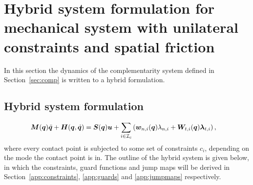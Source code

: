\documentclass[DC2017114Bouma.tex]{subfiles}
\begin{document}
\section{Hybrid system formulation for mechanical system with unilateral constraints and spatial friction}
In this section the dynamics of the complementarity system defined in Section~\ref{sec:comp} is written to a hybrid formulation. 

\subsection{Hybrid system formulation}
\begin{align}
&{\boldsymbol{M}}({\boldsymbol{q}})\ddot{{\boldsymbol{q}}} + {\boldsymbol{H}}({\boldsymbol{q}},\dot{{\boldsymbol{q}}}) = {\boldsymbol{S}}({\boldsymbol{q}}){\boldsymbol{u}} + \sum_{i\in\mathcal{I}_c}\left({\boldsymbol{w}}_{n,i}({\boldsymbol{q}})\lambda_{n,i} + {\boldsymbol{W}}_{t,i}({\boldsymbol{q}})\boldsymbol{\lambda}_{t,i} \right), \label{eq:hybriddyn}
\end{align}
where every contact point is subjected to some set of constraints $c_i$, depending on the mode the contact point is in. The outline of the hybrid system is given below, in which the constraints, guard functions and jump maps will be derived in Section~\ref{app:constraints}, \ref{app:guards} and \ref{app:jumpmaps} respectively.
\end{document}
